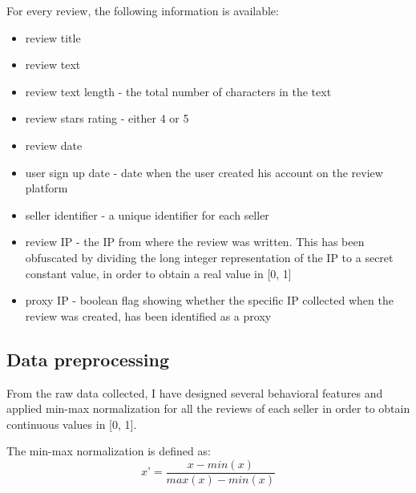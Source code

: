 For every review, the following information is available:
\begin{itemize}
\item review title
\item review text
\item review text length - the total number of characters in the text
\item review stars rating - either 4 or 5
\item review date
\item user sign up date - date when the user created his account on the review platform
\item seller identifier - a unique identifier for each seller
\item review IP - the IP from where the review was written. This has been obfuscated by dividing the long integer representation of the IP to a secret constant value, in order to obtain a real value in [0, 1]
\item proxy IP - boolean flag showing whether the specific IP collected when the review was created, has been identified as a proxy
\end{itemize}

\clearpage

\subsection{Data preprocessing}
From the raw data collected, I have designed several behavioral features and applied min-max normalization for all the reviews of each seller in order to obtain continuous values in [0, 1]. 

The min-max normalization is defined as:
\begin{equation}
x’ = \frac{x -min(x)}{max(x)-min(x)}
\end{equation}

